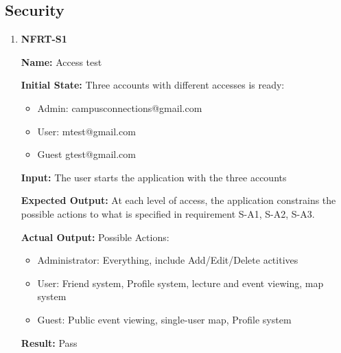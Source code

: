 \documentclass[12pt, titlepage]{article}
\begin{document}
\subsection{Security}
\begin{enumerate}
\item \textbf{NFRT-S1}

\textbf{Name:} Access test

\textbf{Initial State:} Three accounts with different accesses is ready:
\begin{itemize}
\item Admin: campusconnections@gmail.com
\item User: mtest@gmail.com
\item Guest gtest@gmail.com
\end{itemize}
  
\textbf{Input:} The user starts the application with the three accounts

\textbf{Expected Output:} At each level of access, the application constrains the possible actions to what is specified in requirement S-A1, S-A2, S-A3.

\textbf{Actual Output:} Possible Actions:
\begin{itemize}
\item Administrator: Everything, include Add/Edit/Delete actitives
\item User: Friend system, Profile system, lecture and event viewing, map system
\item Guest: Public event viewing, single-user map, Profile system
\end{itemize}

\textbf{Result:} Pass
\end{enumerate}
\end{document}
